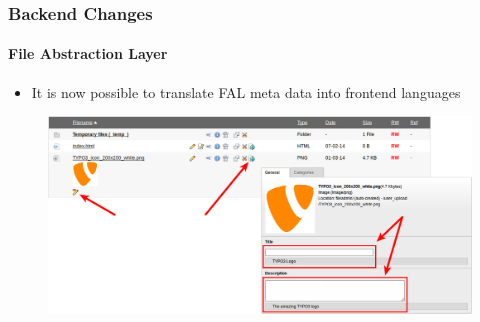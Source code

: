 
\begin{frame}[fragile]
	\frametitle{Backend Changes}
	\framesubtitle{File Abstraction Layer}

	\begin{itemize}
		\item It is now possible to translate FAL meta data into frontend languages
	\end{itemize}

	\begin{figure}
		\includegraphics[width=0.95\linewidth]{Images/BackendChanges/FalTranslateMetaData.png}
	\end{figure}

\end{frame}


